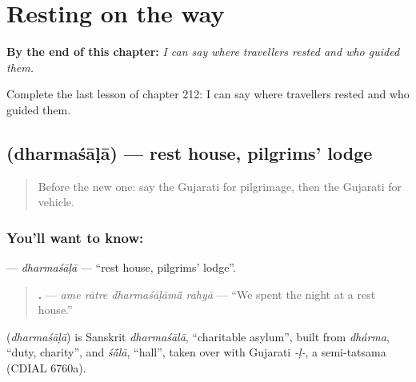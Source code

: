 
\chapter{Resting on the way}
\label{ch:gu-resting-on-the-way}

\begin{chapteropening}
\textbf{By the end of this chapter:} \emph{I can say where travellers rested and who guided them.}

Complete the last lesson of chapter 212: I can say where travellers rested and who guided them.
\end{chapteropening}

\section[\texorpdfstring{\gu{ધર્મશાળા} (dharmaśāḷā)}{ધર્મશાળા (dharmaśāḷā)}]{ (dharmaśāḷā) — rest house, pilgrims' lodge}

\label{lesson:GU-C212-dharmasala}



\begin{quote}
Before the new one: say the Gujarati for pilgrimage, then the Gujarati for vehicle.
\end{quote}

\subsection*{You'll want to know: }
\textbf{} — \emph{dharmaśāḷā} — \textquotedblleft{}rest house, pilgrims' lodge\textquotedblright{}.

\begin{quote}
\textbf{   .} — \emph{ame rātre dharmaśāḷāmā̃ rahyā} — \textquotedblleft{}We spent the night at a rest house.\textquotedblright{}
\end{quote}

\begin{cousinweb}
\textbf{} (\emph{dharmaśāḷā}) is Sanskrit \emph{dharmaśālā}, \textquotedblleft{}charitable asylum\textquotedblright{}, built from \emph{dhárma}, \textquotedblleft{}duty, charity\textquotedblright{}, and \emph{ś\'{\={a}}lā}, \textquotedblleft{}hall\textquotedblright{}, taken over with Gujarati \emph{-ḷ-}, a semi-tatsama (CDIAL 6760a).
\end{cousinweb}

